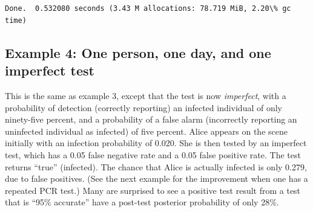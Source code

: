 \documentclass[11pt]{article}
\begin{document}
    \begin{center}
    \end{center}
    { \hspace*{\fill} \\}
    
    \begin{Verbatim}[commandchars=\\\{\}]

Done.  0.532080 seconds (3.43 M allocations: 78.719 MiB, 2.20\% gc time)
    \end{Verbatim}
\newpage
    \hypertarget{example-4-one-person-one-day-and-one-imperfect-test}{%
\subsection{Example 4: One person, one day, and one imperfect
test}\label{example-4-one-person-one-day-and-one-imperfect-test}}

This is the same as example 3, except that the test is now
\emph{imperfect}, with a probability of detection (correctly reporting)
an infected individual of only ninety-five percent, and a probability of
a false alarm (incorrectly reporting an uninfected individual as
infected) of five percent. Alice appears on the scene initially with an
infection probability of 0.020. She is then tested by an imperfect test,
which has a 0.05 false negative rate and a 0.05 false positive rate. The
test returns ``true'' (infected). The chance that Alice is actually
infected is only 0.279, due to false positives. (See the next example
for the improvement when one has a repeated PCR test.) Many are
surprised to see a positive test result from a test that is ``95\%
accurate'' have a post-test posterior probability of only 28\%.
\end{document}
